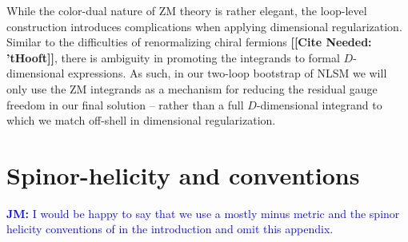 \documentclass[11pt,letter]{article}
\newcommand{\jm}[1]{\textcolor{blue}{\textbf{JM: }{#1}}}
\newcommand{\citepls}[1]{{\bf\color{red}[[Cite Needed: #1]]}}
\begin{document}
While the color-dual nature of ZM theory is rather elegant, the loop-level construction introduces complications when applying dimensional regularization. Similar to the difficulties of renormalizing chiral fermions \citepls{ 'tHooft}, there is ambiguity in promoting the integrands to formal $D$-dimensional expressions. As such, in our two-loop bootstrap of NLSM we will only use the ZM integrands as a mechanism for reducing the residual gauge freedom in our final solution -- rather than a full $D$-dimensional integrand to which we match off-shell in dimensional regularization.

\section{Spinor-helicity and conventions}
\jm{I would be happy to say that we use a mostly minus metric and the spinor helicity conventions of \cite{jjmcTASI2014} in the introduction and omit this appendix.}
\end{document}

